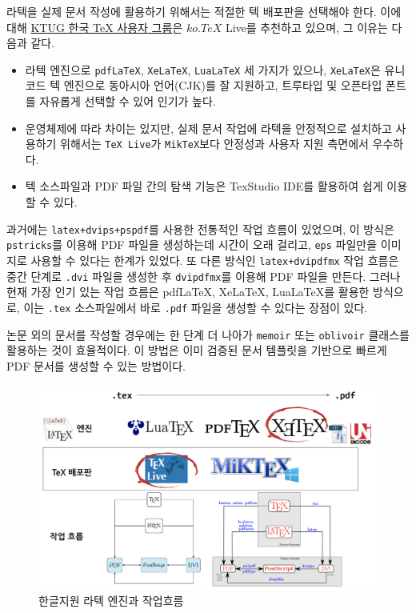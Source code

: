 \documentclass[
  letterpaper,
]{book}
\providecommand{\tightlist}{%
  \setlength{\itemsep}{0pt}\setlength{\parskip}{0pt}}\usepackage{longtable,booktabs,array}
\begin{document}
라텍을 실제 문서 작성에 활용하기 위해서는 적절한 텍 배포판을 선택해야
한다. 이에 대해 \href{http://www.ktug.org/}{KTUG 한국 TeX 사용자 그룹}은
\(ko.TeX\) Live를 추천하고 있으며, 그 이유는 다음과 같다.
\autocite{Lee2017}

\begin{itemize}
\tightlist
\item
  라텍 엔진으로 \texttt{pdfLaTeX}, \texttt{XeLaTeX}, \texttt{LuaLaTeX}
  세 가지가 있으나, \texttt{XeLaTeX}은 유니코드 텍 엔진으로 동아시아
  언어(CJK)를 잘 지원하고, 트루타입 및 오픈타입 폰트를 자유롭게 선택할
  수 있어 인기가 높다.
\item
  운영체제에 따라 차이는 있지만, 실제 문서 작업에 라텍을 안정적으로
  설치하고 사용하기 위해서는 \texttt{TeX\ Live}가 \texttt{MikTeX}보다
  안정성과 사용자 지원 측면에서 우수하다.
\item
  텍 소스파일과 PDF 파일 간의 탐색 기능은 TexStudio IDE를 활용하여 쉽게
  이용할 수 있다.
\end{itemize}

과거에는 \texttt{latex+dvips+pspdf}를 사용한 전통적인 작업 흐름이
있었으며, 이 방식은 \texttt{pstricks}를 이용해 PDF 파일을 생성하는데
시간이 오래 걸리고, \texttt{eps} 파일만을 이미지로 사용할 수 있다는
한계가 있었다. 또 다른 방식인 \texttt{latex+dvipdfmx} 작업 흐름은 중간
단계로 \texttt{.dvi} 파일을 생성한 후 \texttt{dvipdfmx}를 이용해 PDF
파일을 만든다. 그러나 현재 가장 인기 있는 작업 흐름은 pdfLaTeX, XeLaTeX,
LuaLaTeX를 활용한 방식으로, 이는 \texttt{.tex} 소스파일에서 바로
\texttt{.pdf} 파일을 생성할 수 있다는 장점이 있다.

논문 외의 문서를 작성할 경우에는 한 단계 더 나아가 \texttt{memoir} 또는
\texttt{oblivoir} 클래스를 활용하는 것이 효율적이다. 이 방법은 이미
검증된 문서 템플릿을 기반으로 빠르게 PDF 문서를 생성할 수 있는 방법이다.

\begin{figure}

{\centering \includegraphics{images/tex-engines.png}

}

\caption{한글지원 라텍 엔진과 작업흐름}

\end{figure}
\end{document}
